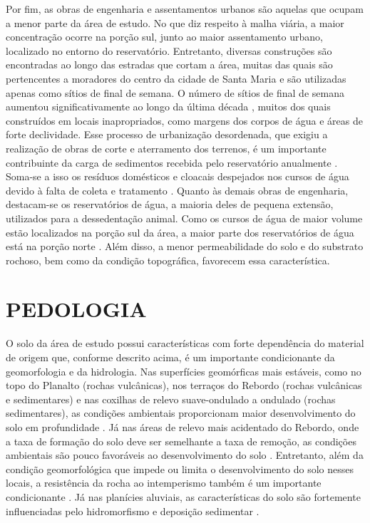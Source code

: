 Por fim, as obras de engenharia e assentamentos urbanos são aquelas que ocupam a menor parte da área de 
estudo. No que diz respeito à malha viária, a maior concentração ocorre na porção sul, junto ao maior 
assentamento urbano, localizado no entorno do reservatório. Entretanto, diversas construções são encontradas 
ao longo das estradas que cortam a área, muitas das quais são pertencentes a moradores do centro da cidade de 
Santa Maria e são utilizadas apenas como sítios de final de semana. O número de sítios de final de semana 
aumentou significativamente ao longo da última década \cite{Goldani2006}, muitos dos quais construídos em 
locais inapropriados, como margens dos corpos de água e áreas de forte declividade. Esse processo de 
urbanização desordenada, que exigiu a realização de obras de corte e aterramento dos terrenos, é um importante 
contribuinte da carga de sedimentos recebida pelo reservatório anualmente \cite{PaivaEtAl2001, DillEtAl2004, 
MiguelEtAl2014}. Soma-se a isso os resíduos domésticos e cloacais despejados nos cursos de água devido à falta 
de coleta e tratamento \cite{Goldani2006}. Quanto às demais obras de engenharia, destacam-se os reservatórios 
de água, a maioria deles de pequena extensão, utilizados para a dessedentação animal. Como os cursos de água 
de maior volume estão localizados na porção sul da área, a maior parte dos reservatórios de água está na 
porção norte \cite{SamuelRosaEtAl2011a}. Além disso, a menor permeabilidade do solo e do substrato rochoso, bem 
como da condição topográfica, favorecem essa característica.

\section{PEDOLOGIA}

O solo da área de estudo possui características com forte dependência do material de origem 
\cite{NascimentoEtAl2010} que, conforme descrito acima, é um importante condicionante da geomorfologia e da 
hidrologia. Nas superfícies geomórficas mais estáveis, como no topo do Planalto (rochas vulcânicas), nos 
terraços do Rebordo (rochas vulcânicas e sedimentares) e nas coxilhas de relevo suave-ondulado a ondulado 
(rochas sedimentares), as condições ambientais proporcionam maior desenvolvimento do solo em profundidade 
\cite{Moser1990}. Já nas áreas de relevo mais acidentado do Rebordo, onde a taxa de formação do solo deve ser 
semelhante a taxa de remoção, as condições ambientais são pouco favoráveis ao desenvolvimento do solo 
\cite{Moser1990, DalmolinEtAl2006a, Sturmer2008, SamuelRosaEtAl2011a}. Entretanto, além da condição 
geomorfológica que impede ou limita o desenvolvimento do solo nesses locais, a resistência da rocha ao 
intemperismo também é um importante condicionante \cite{Pedron2007}. Já nas planícies aluviais, as 
características do solo são fortemente influenciadas pelo hidromorfismo e deposição sedimentar 
\cite{Moser1990, Miguel2010}.

